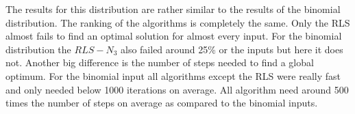 The results for this distribution are rather similar to the results of the binomial distribution.
The ranking of the algorithms is completely the same.
Only the RLS almost fails to find an optimal solution for almost every input.
For the binomial distribution the $RLS-N_3$ also failed around 25\% or the inputs but here it does not.
Another big difference is the number of steps needed to find a global optimum.
For the binomial input all algorithms except the RLS were really fast and only needed below 1000 iterations on average.
All algorithm need around 500 times the number of steps on average as compared to the binomial inputs.